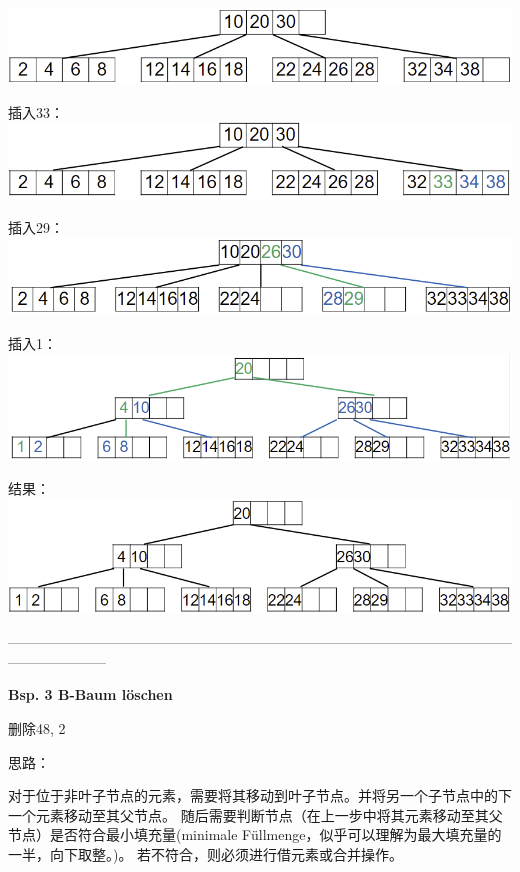\documentclass[fleqn]{article}
\begin{document}
\begin{center}
    \includegraphics[scale=0.5]{29.png}

    插入33：
    \includegraphics[scale=0.5]{30.png}

    插入29：
    \includegraphics[scale=0.5]{31.png}

    插入1：
    \includegraphics[scale=0.5]{32.png}

    结果：
    \includegraphics[scale=0.5]{33.png}
\end{center}

\noindent---------------------------------------------------------------------------------------------------------------------------------

\noindent\textbf{Bsp. 3 B-Baum  löschen}

删除48, 2

思路：

对于位于非叶子节点的元素，需要将其移动到叶子节点。并将另一个子节点中的下一个元素移动至其父节点。
随后需要判断节点（在上一步中将其元素移动至其父节点）是否符合最小填充量(minimale Füllmenge，似乎可以理解为最大填充量的一半，向下取整。)。
若不符合，则必须进行借元素或合并操作。
\end{document}
